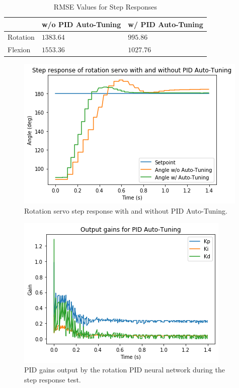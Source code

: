 \documentclass[letterpaper,12pt]{article}
\begin{document}
\begin{table}[H]
	\begin{center}
		\caption{RMSE Values for Step Responses}
        \label{tab:rmse_results}
        \begin{tabular}{l|l|l}
					& w/o PID Auto-Tuning & w/ PID Auto-Tuning \\
					\hline
        	Rotation & $1383.64$ & $995.86$ \\
					Flexion & $1553.36$ & $1027.76$ \\
        \end{tabular}
	\end{center}
\end{table}

\begin{figure}[H]
\centering \includegraphics[width=0.8\columnwidth]{rotation_results.png}
\caption{\label{fig:rotation_results}Rotation servo step response with and without PID Auto-Tuning.}
\end{figure}

\begin{figure}[H]
\centering \includegraphics[width=0.8\columnwidth]{rotation_gains.png}
\caption{\label{fig:rotation_gains}PID gains output by the rotation PID neural network during the step response test.}
\end{figure}
\end{document}
